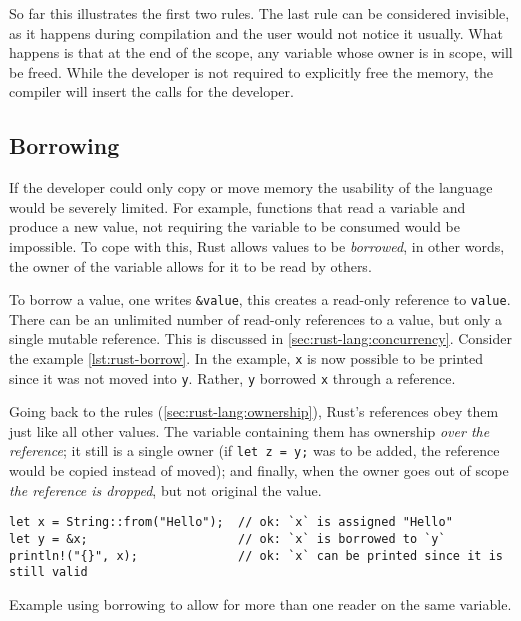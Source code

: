 So far this illustrates the first two rules. The last rule can be considered invisible,
as it happens during compilation and the user would not notice it usually.
What happens is that at the end of the scope, any variable whose owner is in scope, will be freed.
While the developer is not required to explicitly free the memory, the compiler will insert the calls for the developer.

\subsection{Borrowing}\label{sec:rust-lang:borrowing}

If the developer could only copy or move memory the usability of the language would be severely limited.
For example, functions that read a variable and produce a new value,
not requiring the variable to be consumed would be impossible.
To cope with this, Rust allows values to be \emph{borrowed}, in other words,
the owner of the variable allows for it to be read by others.

To borrow a value, one writes \texttt{\&value}, this creates a read-only reference to \texttt{value}.
There can be an unlimited number of read-only references to a value, but only a single mutable reference.
This is discussed in \autoref{sec:rust-lang:concurrency}. Consider the example \autoref{lst:rust-borrow}.
In the example, \texttt{x} is now possible to be printed since it was not moved into \texttt{y}.
Rather, \texttt{y} borrowed \texttt{x} through a reference.

Going back to the rules (\autoref{sec:rust-lang:ownership}), Rust's references obey them just like all other values.
The variable containing them has ownership \emph{over the reference}; it still is a single owner
(if \texttt{let z = y;} was to be added, the reference would be copied instead of moved);
and finally, when the owner goes out of scope \emph{the reference is dropped}, but not original the value.

\begin{listing}
    \begin{verbatim}
let x = String::from("Hello");  // ok: `x` is assigned "Hello"
let y = &x;                     // ok: `x` is borrowed to `y`
println!("{}", x);              // ok: `x` can be printed since it is still valid
    \end{verbatim}
    \caption{Example using borrowing to allow for more than one reader on the same variable.}
    \label{lst:rust-borrow}
\end{listing}


